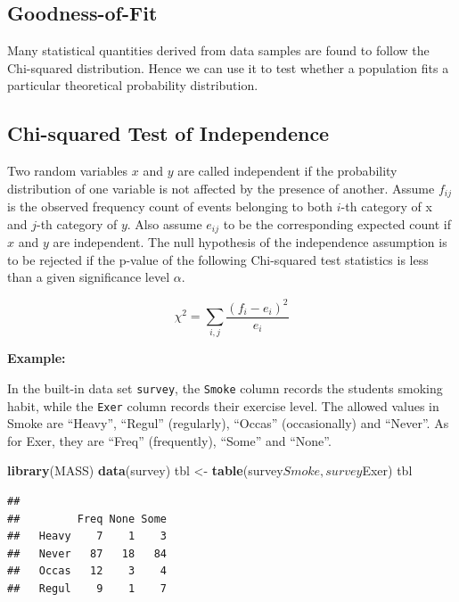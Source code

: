 \documentclass[]{article}
\newenvironment{Shaded}{\begin{snugshade}}{\end{snugshade}}
\newcommand{\KeywordTok}[1]{\textcolor[rgb]{0.13,0.29,0.53}{\textbf{{#1}}}}
\newcommand{\StringTok}[1]{\textcolor[rgb]{0.31,0.60,0.02}{{#1}}}
\newcommand{\NormalTok}[1]{{#1}}
\numberwithin{equation}{section}
\begin{document}
\subsection{Goodness-of-Fit}\label{goodness-of-fit}

Many statistical quantities derived from data samples are found to
follow the Chi-squared distribution. Hence we can use it to test whether
a population fits a particular theoretical probability distribution.

\subsection{Chi-squared Test of
Independence}\label{chi-squared-test-of-independence}

Two random variables \(x\) and \(y\) are called independent if the
probability distribution of one variable is not affected by the presence
of another. Assume \(f_{ij}\) is the observed frequency count of events
belonging to both \(i\)-th category of x and \(j\)-th category of \(y\).
Also assume \(e_{ij}\) to be the corresponding expected count if \(x\)
and \(y\) are independent. The null hypothesis of the independence
assumption is to be rejected if the p-value of the following Chi-squared
test statistics is less than a given significance level \(\alpha\).

\[
  \chi^2 = \sum_{i,j}\frac{(f_i - e_i)^2}{e_i}
\]

\textbf{Example:}

In the built-in data set \texttt{survey}, the \texttt{Smoke} column
records the students smoking habit, while the \texttt{Exer} column
records their exercise level. The allowed values in Smoke are ``Heavy'',
``Regul'' (regularly), ``Occas'' (occasionally) and ``Never''. As for
Exer, they are ``Freq'' (frequently), ``Some'' and ``None''.

\begin{Shaded}
\begin{Highlighting}[]
\KeywordTok{library}\NormalTok{(MASS)}
\KeywordTok{data}\NormalTok{(survey)}
\NormalTok{tbl <-}\StringTok{ }\KeywordTok{table}\NormalTok{(survey$Smoke,survey$Exer)}
\NormalTok{tbl}
\end{Highlighting}
\end{Shaded}

\begin{verbatim}
##        
##         Freq None Some
##   Heavy    7    1    3
##   Never   87   18   84
##   Occas   12    3    4
##   Regul    9    1    7
\end{verbatim}
\end{document}
